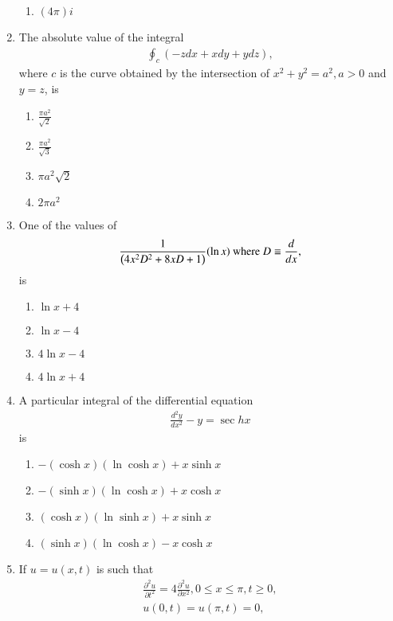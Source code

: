 \documentclass[journal]{IEEEtran}
\begin{document}
\begin{enumerate}
\begin{enumerate}
			\item $(4 \pi) i$
        	\end{enumerate}	
	\item The absolute value of the integral
           \begin{align*}
		\oint_{c}(-zdx+xdy+ydz),
             \end{align*}
             where $c$ is the curve obtained by the intersection of $x^{2}+y^{2}=a^{2}, a>0$ and $y=z$, is
		\begin{enumerate}
			\item $\frac{\pi a^{2}}{\sqrt{2}}$
			\item $\frac{\pi a^{2}}{\sqrt{3}}$
			\item $\pi a^{2} \sqrt{2}$
			\item $2 \pi a^{2}$
        	\end{enumerate}	
	\item One of the values of
           \begin{align*}
		\frac{1}{\left(4 x^{2} D^{2}+8 x D+1\right)}(\ln x) \text { where } D \equiv \frac{d}{d x},
             \end{align*} 
             is
		\begin{enumerate}
			\item $\ln x+4$
			\item $\ln x-4$
			\item $4 \ln x-4$
			\item $4 \ln x+4$
        	\end{enumerate}	
	\item A particular integral of the differential equation
             \begin{align*}
		\frac{d^{2} y}{d x^{2}}-y=\sec h x
             \end{align*}
	 is
		\begin{enumerate}
			\item $-(\cosh x)(\ln \cosh x)+x \sinh x$
			\item $-(\sinh x)(\ln \cosh x)+x \cosh x$
			\item $(\cosh x)(\ln \sinh x)+x \sinh x$
			\item $(\sinh x)(\ln \cosh x)-x \cosh x$
        	\end{enumerate}
	\item If $u=u(x, t)$ is such that
                \begin{align*}
\frac{\partial^{2} u}{\partial t^{2}}=4 \frac{\partial^{2} u}{\partial x^{2}},
0 \leq x \leq \pi, t \geq 0,\\
u(0, t)=u(\pi, t)=0,

\end{align*}
\end{enumerate}
\end{document}
